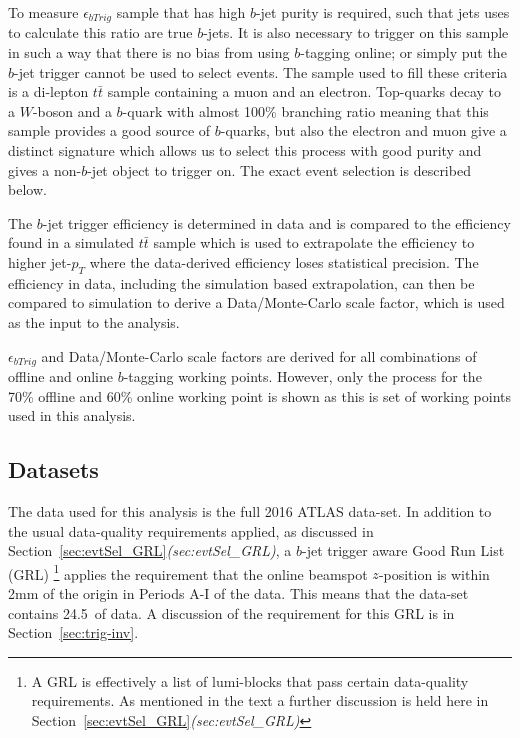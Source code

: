 To measure $\epsilon_{bTrig}$ sample that has high $b$-jet purity is required,
such that jets uses to calculate this ratio are true $b$-jets.
It is also necessary to trigger on this sample in such a way that there is no bias from using $b$-tagging online;
or simply put the $b$-jet trigger cannot be used to select events.
The sample used to fill these criteria is a di-lepton $t\bar{t}$ sample containing a muon and an electron.
Top-quarks decay to a $W$-boson and a $b$-quark with almost 100\% branching ratio meaning that this sample provides a good source of $b$-quarks,
but also the electron and muon give a distinct signature which allows us to select this process with good purity and gives a non-$b$-jet object to trigger on.
The exact event selection is described below. 

The $b$-jet trigger efficiency is determined in data and is compared to the efficiency found in a 
simulated $t\bar{t}$ sample which is used to extrapolate the efficiency to 
higher jet-$p_T$ where the data-derived efficiency loses statistical precision.
The efficiency in data, including the simulation based extrapolation, can then be
compared to simulation to derive a Data/Monte-Carlo scale factor, which is used as the input to the analysis.


$\epsilon_{bTrig}$ and Data/Monte-Carlo scale factors are derived for all combinations of offline and online $b$-tagging working points.
However, only the process for the 70\% offline and 60\% online working point is shown
as this is set of working points used in this analysis.

\subsection{Datasets}
The data used for this analysis is the full 2016 ATLAS data-set.
In addition to the usual data-quality requirements applied,
as discussed in Section~\ref{sec:evtSel_GRL}\textit{(sec:evtSel\_GRL)},
a $b$-jet trigger aware Good Run List (GRL)
\footnote{A GRL is effectively a list of lumi-blocks that pass certain data-quality requirements.
 As mentioned in the text a further discussion is held here in Section~\ref{sec:evtSel_GRL}\textit{(sec:evtSel\_GRL)}}
applies the requirement that the online beamspot $z$-position is within 2mm of the origin in Periods A-I of the data.
This means that the data-set contains 24.5~\ifb of data.
A discussion of the requirement for this GRL is in Section~\ref{sec:trig-inv}. 

